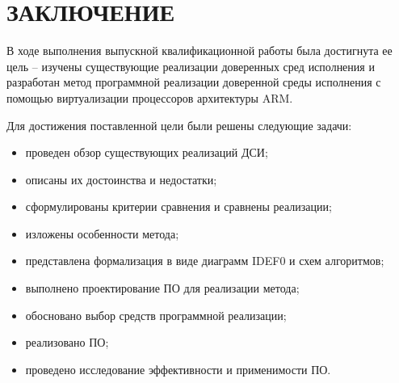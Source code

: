 \section*{ЗАКЛЮЧЕНИЕ}

В ходе выполнения выпускной квалификационной работы была достигнута ее цель -- изучены существующие реализации доверенных сред исполнения и разработан метод программной реализации доверенной среды исполнения с помощью виртуализации процессоров архитектуры ARM.

Для достижения поставленной цели были решены следующие задачи:

\begin{itemize}
	\item проведен обзор существующих реализаций ДСИ;
	\item описаны их достоинства и недостатки;
	\item сформулированы критерии сравнения и сравнены реализации;
	\item изложены особенности метода;
	\item представлена формализация в виде диаграмм IDEF0 и схем алгоритмов;
	\item выполнено проектирование ПО для реализации метода;
	\item обосновано выбор средств программной реализации;
	\item реализовано ПО;
	\item проведено исследование эффективности и применимости ПО.
\end{itemize}

\pagebreak